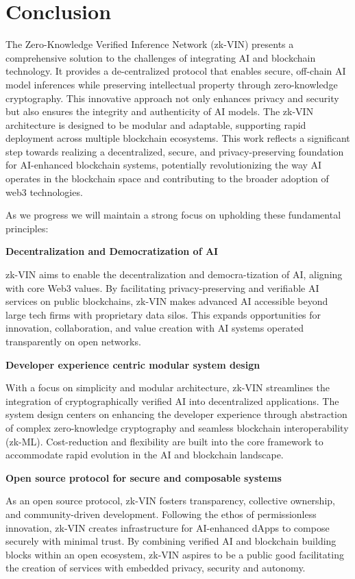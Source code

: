 \documentclass[conference]{IEEEtran}
\begin{document}
\section{Conclusion}
The Zero-Knowledge Veriﬁed Inference Network (zk-VIN) presents a comprehensive solution to the challenges of integrating AI and blockchain technology. It provides a de-centralized protocol that enables secure, off-chain AI model inferences while preserving intellectual property through zero-knowledge cryptography. This innovative approach not only enhances privacy and security but also ensures the integrity and authenticity of AI models. The zk-VIN architecture is designed to be modular and adaptable, supporting rapid deployment across multiple blockchain ecosystems. This work reﬂects a signiﬁcant step towards realizing a decentralized, secure, and privacy-preserving foundation for AI-enhanced blockchain systems, potentially revolutionizing the way AI operates in the blockchain space and contributing to the broader adoption of web3 technologies.

As we progress we will maintain a strong focus on upholding these fundamental principles:

\textbf{Decentralization and Democratization of AI}

zk-VIN aims to enable the decentralization and democra-tization of AI, aligning with core Web3 values. By facilitating privacy-preserving and veriﬁable AI services on public blockchains, zk-VIN makes advanced AI accessible beyond large tech ﬁrms with proprietary data silos. This expands opportunities for innovation, collaboration, and value creation with AI systems operated transparently on open networks.

\textbf{Developer experience centric modular system design}

With a focus on simplicity and modular architecture, zk-VIN streamlines the integration of cryptographically veriﬁed AI into decentralized applications. The system design centers on enhancing the developer experience through abstraction of complex zero-knowledge cryptography and seamless blockchain interoperability (zk-ML). Cost-reduction and ﬂexibility are built into the core framework to accommodate rapid evolution in the AI and blockchain landscape.

\textbf{Open source protocol for secure and composable systems}

As an open source protocol, zk-VIN fosters transparency, collective ownership, and community-driven development. Following the ethos of permissionless innovation, zk-VIN creates infrastructure for AI-enhanced dApps to compose securely with minimal trust. By combining veriﬁed AI and blockchain building blocks within an open ecosystem, zk-VIN aspires to be a public good facilitating the creation of services with embedded privacy, security and autonomy.
\end{document}

